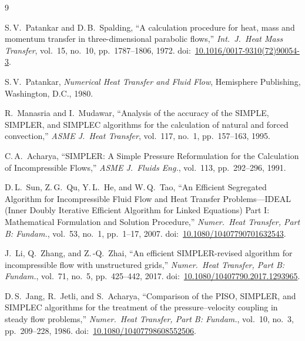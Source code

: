 \documentclass[11pt,a4paper]{article}
\begin{document}
\begin{thebibliography}{9}

S.\,V.\ Patankar and D.\,B.\ Spalding, ``A calculation procedure for heat,
mass and momentum transfer in three-dimensional parabolic flows,''
\emph{Int.\ J.\ Heat Mass Transfer}, vol.~15, no.~10, pp.~1787--1806, 1972.
doi:~\url{10.1016/0017-9310(72)90054-3}.

S.\,V.\ Patankar, \emph{Numerical Heat Transfer and Fluid Flow}, Hemisphere
Publishing, Washington, D.C., 1980.

R.\ Manasria and I.\ Mudawar, ``Analysis of the accuracy of the SIMPLE,
SIMPLER, and SIMPLEC algorithms for the calculation of natural and forced
convection,'' \emph{ASME J.\ Heat Transfer}, vol.~117, no.~1, pp.~157--163,
1995.

C.\,A.\ Acharya, ``SIMPLER: A Simple Pressure Reformulation for the
Calculation of Incompressible Flows,'' \emph{ASME J.\ Fluids Eng.}, vol.~113,
pp.~292--296, 1991.

D.\,L.\ Sun, Z.\,G.\ Qu, Y.\,L.\ He, and W.\,Q.\ Tao, ``An Efficient
Segregated Algorithm for Incompressible Fluid Flow and Heat Transfer
Problems---IDEAL (Inner Doubly Iterative Efficient Algorithm for Linked
Equations) Part I: Mathematical Formulation and Solution Procedure,''
\emph{Numer.\ Heat Transfer, Part B: Fundam.}, vol.~53, no.~1, pp.~1--17,
2007. doi:~\url{10.1080/10407790701632543}.

J.\ Li, Q.\ Zhang, and Z.\,-Q.\ Zhai, ``An efficient SIMPLER-revised
algorithm for incompressible flow with unstructured grids,''
\emph{Numer.\ Heat Transfer, Part B: Fundam.}, vol.~71, no.~5, pp.~425--442,
2017. doi:~\url{10.1080/10407790.2017.1293965}.

D.\,S.\ Jang, R.\ Jetli, and S.\ Acharya, ``Comparison of the PISO, SIMPLER,
and SIMPLEC algorithms for the treatment of the pressure--velocity coupling
in steady flow problems,'' \emph{Numer.\ Heat Transfer, Part B: Fundam.},
vol.~10, no.~3, pp.~209--228, 1986. doi:~\url{10.1080/10407798608552506}.

\end{thebibliography}
\end{document}
